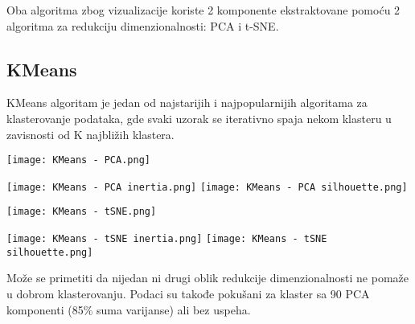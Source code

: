 \documentclass[a4paper]{article}
\begin{document}
    Oba algoritma zbog vizualizacije koriste 2 komponente ekstraktovane pomoću 2 algoritma za redukciju dimenzionalnosti: PCA i t-SNE.

    \subsection{KMeans}
        KMeans algoritam je jedan od najstarijih i najpopularnijih algoritama za klasterovanje podataka, gde svaki uzorak se iterativno spaja nekom klasteru u zavisnosti od K najbližih klastera. 

        \begin{center}
            \label{im:KMeans - PCA}
            \texttt{[image: KMeans - PCA.png]}
        \end{center}

        \begin{center}
            \label{im:KMeans - PCA inertia}
            \texttt{[image: KMeans - PCA inertia.png]}
            \label{im:KMeans - PCA sihouette}
            \texttt{[image: KMeans - PCA silhouette.png]}
        \end{center}

        
        \begin{center}
            \texttt{[image: KMeans - tSNE.png]}
        \end{center}
        
        \begin{center}
            \label{im:KMeans - tSNE inertia}
            \texttt{[image: KMeans - tSNE inertia.png]}
            \label{im:KMeans - tSNE sihouette}
            \texttt{[image: KMeans - tSNE silhouette.png]}
        \end{center}
        
        Može se primetiti da nijedan ni drugi oblik redukcije dimenzionalnosti ne pomaže u dobrom klasterovanju. Podaci su takođe pokušani za klaster sa 90 PCA komponenti (85\% suma varijanse) ali bez uspeha.
\end{document}

